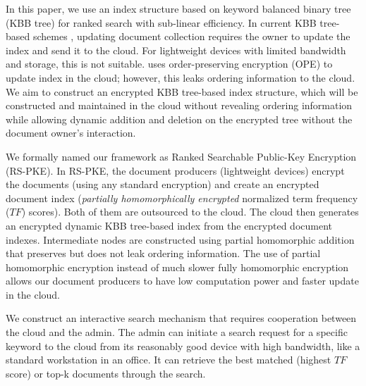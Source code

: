 \documentclass[sigconf,pdftex]{acmart}
\begin{document}
In this paper, we use an index structure based on keyword balanced binary tree (KBB tree) \cite{xia2015secure, smithamol2018pecs, peng2018efficient} for ranked search with sub-linear efficiency. In current KBB tree-based schemes \cite{xia2015secure, peng2018efficient}, updating document collection requires the owner to update the index and send it to the cloud. For lightweight devices with limited bandwidth and storage, this is not suitable. \cite{smithamol2018pecs} uses order-preserving encryption (OPE) to update index in the cloud; however, this leaks ordering information to the cloud. We aim to construct an encrypted KBB tree-based index structure, which will be constructed and maintained in the cloud without revealing ordering information while allowing dynamic addition and deletion on the encrypted tree without the document owner's interaction.




We formally named our framework as Ranked Searchable Public-Key Encryption (RS-PKE). In RS-PKE, the document producers (lightweight devices) encrypt the documents (using any standard encryption) and create an encrypted document index (\textit{partially homomorphically encrypted} normalized term frequency ($TF$) scores). Both of them are outsourced to the cloud. The cloud then generates an encrypted dynamic KBB tree-based index from the encrypted document indexes. Intermediate nodes are constructed using partial homomorphic addition that preserves but does not leak ordering information. The use of partial homomorphic encryption instead of much slower fully homomorphic encryption allows our document producers to have low computation power and faster update in the cloud.



We construct an interactive search mechanism that requires cooperation between the cloud and the admin. The admin can initiate a search request for a specific keyword to the cloud from its reasonably good device with high bandwidth, like a standard workstation in an office. It can retrieve the best matched (highest $TF$ score) or top-k documents through the search.
\end{document}

